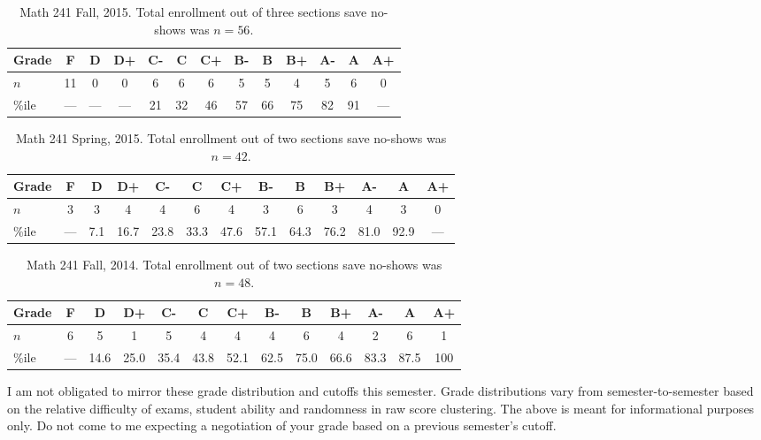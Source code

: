 \documentclass[12pt]{article}
\begin{document}
\begin{table}[h]
\centering
\begin{tabular}{l|cccccccccccc}
Grade & F   & D      & D+   & C-    & C     & C+    & B-    & B     & B+   & A-    & A      & A+ \\ \hline
$n$   & 11    & 0      & 0     & 6      & 6     & 6      & 5     & 5     & 4     & 5      & 6      & 0 \\
\%ile & --- & ---  &  ---        & 21    & 32   & 46    & 57   & 66   & 75 & 82 & 91 & --- \\ \hline
\end{tabular}
\caption{Math 241 Fall, 2015. Total enrollment out of three sections save no-shows was $n=56$.}
\end{table}
\FloatBarrier
\begin{table}[h]
\centering
\begin{tabular}{l|cccccccccccc}
Grade & F   & D      & D+   & C-    & C     & C+    & B-    & B     & B+   & A-    & A      & A+ \\ \hline
$n$   & 3    & 3      & 4      & 4      & 6     & 4      & 3     & 6      & 3     & 4      & 3      & 0 \\
\%ile & --- & 7.1  &  16.7 & 23.8 & 33.3 & 47.6 & 57.1 & 64.3 & 76.2 &  81.0 & 92.9 & --- \\ \hline
\end{tabular}
\caption{Math 241 Spring, 2015. Total enrollment out of two sections save no-shows was $n=42$.}
\end{table}
\FloatBarrier
\begin{table}[h]
\centering
\begin{tabular}{l|cccccccccccc}
Grade & F & D & D+ & C- & C & C+ & B- & B & B+ & A- & A & A+ \\ \hline
$n$ & 6 & 5 & 1 & 5 & 4 & 4 & 4 & 6 & 4 & 2 & 6 & 1 \\
\%ile & --- & 14.6 &  25.0 & 35.4 & 43.8 & 52.1 & 62.5 & 75.0 & 66.6 &  83.3 & 87.5 & 100 \\ \hline
\end{tabular}
\caption{Math 241 Fall, 2014. Total enrollment out of two sections save no-shows was $n=48$.}
\end{table}
\FloatBarrier

I am not obligated to mirror these grade distribution and cutoffs this semester. Grade distributions vary from semester-to-semester based on the relative difficulty of exams, student ability and randomness in raw score clustering. The above is meant for informational purposes only. Do not come to me expecting a negotiation of your grade based on a previous semester's cutoff.
\end{document}

